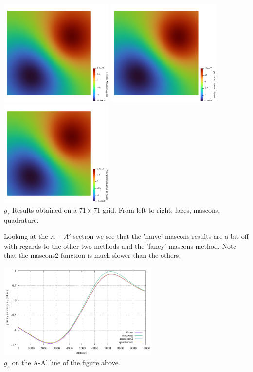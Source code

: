 \begin{center}
\includegraphics[width=5.7cm]{python_codes/fieldstone_113/results/hex_test3/g_faces}
\includegraphics[width=5.7cm]{python_codes/fieldstone_113/results/hex_test3/g_mascons}
\includegraphics[width=5.7cm]{python_codes/fieldstone_113/results/hex_test3/g_quadrature}\\
{\captionfont $g_z$ Results obtained on a $71\times71$ grid. From left to right: 
faces, mascons, quadrature.}
\end{center}

Looking at the $A-A'$ section we see that the 'naive' mascons results are 
a bit off with regards to the other two methods and the 'fancy' mascons method.
Note that the mascons2 function is much slower than the others.

\begin{center}
\includegraphics[width=8cm]{python_codes/fieldstone_113/results/hex_test3/line.pdf}\\
{\captionfont $g_z$ on the A-A' line of the figure above.}
\end{center}


